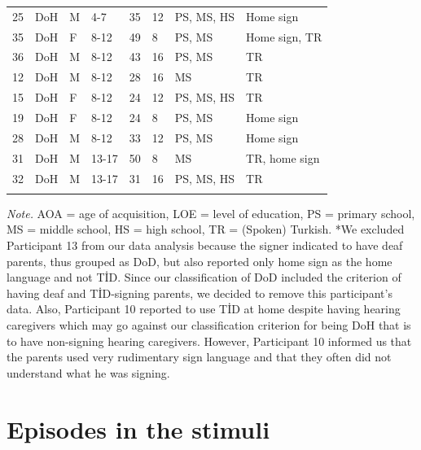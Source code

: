 \documentclass[]{elsarticle} %
\begin{document}
\begin{table}[hbt!]
\begin{center}
\begin{threeparttable}
{\begin{tabular}{llllllll}
25 & DoH & M & 4-7 & 35 & 12 & PS, MS, HS & Home sign\\
35 & DoH & F & 8-12 & 49 & 8 & PS, MS & Home sign, TR\\
36 & DoH & M & 8-12 & 43 & 16 & PS, MS & TR\\
12 & DoH & M & 8-12 & 28 & 16 & MS & TR\\
15 & DoH & F & 8-12 & 24 & 12 & PS, MS, HS & TR\\
19 & DoH & F & 8-12 & 24 & 8 & PS, MS & Home sign\\
28 & DoH & M & 8-12 & 33 & 12 & PS, MS & Home sign\\
31 & DoH & M & 13-17 & 50 & 8 & MS & TR, home sign\\
32 & DoH & M & 13-17 & 31 & 16 & PS, MS, HS & TR\\
\bottomrule
\addlinespace
\end{tabular}

}

\begin{tablenotes}[para]
\normalsize{\textit{Note.} AOA = age of acquisition, LOE = level of education, PS = primary school, MS = middle school, HS = high school, TR = (Spoken) Turkish. *We excluded Participant 13 from our data analysis because the signer indicated to have deaf parents, thus grouped as DoD, but also reported only home sign as the home language and not TİD. Since our classification of DoD included the criterion of having deaf and TİD-signing parents, we decided to remove this participant's data. Also, Participant 10 reported to use TİD at home despite having hearing caregivers which may go against our classification criterion for being DoH that is to have non-signing hearing caregivers. However, Participant 10 informed us that the parents used very rudimentary sign language and that they often did not understand what he was signing.}
\end{tablenotes}

\end{threeparttable}
\end{center}

\end{table}

\clearpage

\setlength{\columnsep}{10pt}
\twocolumn
\linespread{1}
\justifying
\footnotesize

\hypertarget{episodes-in-the-stimuli}{%
\section{Episodes in the stimuli}\label{episodes-in-the-stimuli}}
\end{document}
